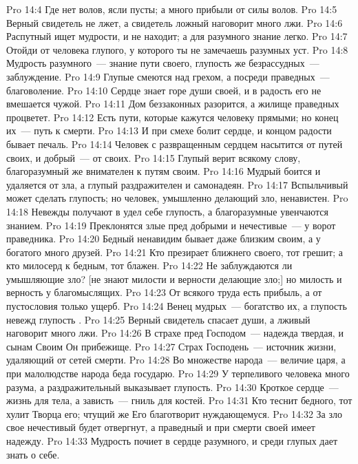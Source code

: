 \vs Pro 14:4 Где нет волов,  ясли пусты; а много прибыли от силы волов.
\vs Pro 14:5 Верный свидетель не лжет, а свидетель ложный наговорит много лжи.
\vs Pro 14:6 Распутный ищет мудрости, и не находит; а для разумного знание легко.
\vs Pro 14:7 Отойди от человека глупого, у которого ты не замечаешь разумных уст.
\vs Pro 14:8 Мудрость разумного~--- знание пути своего, глупость же безрассудных~--- заблуждение.
\vs Pro 14:9 Глупые смеются над грехом, а посреди праведных~--- благоволение.
\vs Pro 14:10 Сердце знает горе души своей, и в радость его не вмешается чужой.
\vs Pro 14:11 Дом беззаконных разорится, а жилище праведных процветет.
\vs Pro 14:12 Есть пути, которые кажутся человеку прямыми; но конец их~--- путь к смерти.
\vs Pro 14:13 И при смехе  болит сердце, и концом радости бывает печаль.
\vs Pro 14:14 Человек с развращенным сердцем насытится от путей своих, и добрый~--- от своих.
\vs Pro 14:15 Глупый верит всякому слову, благоразумный же внимателен к путям своим.
\vs Pro 14:16 Мудрый боится и удаляется от зла, а глупый раздражителен и самонадеян.
\vs Pro 14:17 Вспыльчивый может сделать глупость; но человек, умышленно делающий зло, ненавистен.
\vs Pro 14:18 Невежды получают в удел себе глупость, а благоразумные увенчаются знанием.
\vs Pro 14:19 Преклонятся злые пред добрыми и нечестивые~--- у ворот праведника.
\vs Pro 14:20 Бедный ненавидим бывает даже близким своим, а у богатого много друзей.
\vs Pro 14:21 Кто презирает ближнего своего, тот грешит; а кто милосерд к бедным, тот блажен.
\vs Pro 14:22 Не заблуждаются ли умышляющие зло? [не знают милости и верности делающие зло;] но милость и верность у благомыслящих.
\vs Pro 14:23 От всякого труда есть прибыль, а от пустословия только ущерб.
\vs Pro 14:24 Венец мудрых~--- богатство их, а глупость невежд глупость .
\vs Pro 14:25 Верный свидетель спасает души, а лживый наговорит много лжи.
\vs Pro 14:26 В страхе пред Господом~--- надежда твердая, и сынам Своим Он прибежище.
\vs Pro 14:27 Страх Господень~--- источник жизни, удаляющий от сетей смерти.
\vs Pro 14:28 Во множестве народа~--- величие царя, а при малолюдстве народа беда государю.
\vs Pro 14:29 У терпеливого человека много разума, а раздражительный выказывает глупость.
\vs Pro 14:30 Кроткое сердце~--- жизнь для тела, а зависть~--- гниль для костей.
\vs Pro 14:31 Кто теснит бедного, тот хулит Творца его; чтущий же Его благотворит нуждающемуся.
\vs Pro 14:32 За зло свое нечестивый будет отвергнут, а праведный и при смерти своей имеет надежду.
\vs Pro 14:33 Мудрость почиет в сердце разумного, и среди глупых дает знать о себе.
